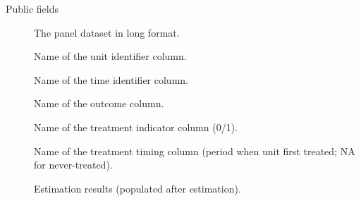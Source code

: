 \documentclass[a4paper]{book}
\begin{document}
%
\begin{Section}{Public fields}

\begin{description}

\item[] The panel dataset in long format.

\item[] Name of the unit identifier column.

\item[] Name of the time identifier column.

\item[] Name of the outcome column.

\item[] Name of the treatment indicator column (0/1).

\item[] Name of the treatment timing column
(period when unit first treated; NA for never-treated).

\item[] Estimation results (populated after estimation).

\end{description}


\end{Section}
%
\end{document}
